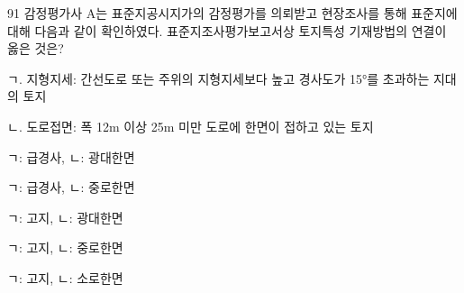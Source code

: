 \begin{question}{91}
감정평가사 A는 표준지공시지가의 감정평가를 의뢰받고 현장조사를 통해 표준지에 대해 다음과 같이 확인하였다. 표준지조사평가보고서상 토지특성 기재방법의 연결이 옳은 것은?
\begin{framedtext}
ㄱ. 지형지세: 간선도로 또는 주위의 지형지세보다 높고 경사도가 15°를 초과하는 지대의 토지 \par
ㄴ. 도로접면: 폭 12m 이상 25m 미만 도로에 한면이 접하고 있는 토지 \par
\end{framedtext}
\begin{choices}
  \item ㄱ: 급경사, ㄴ: 광대한면
  \item ㄱ: 급경사, ㄴ: 중로한면
  \item ㄱ: 고지, ㄴ: 광대한면
  \item ㄱ: 고지, ㄴ: 중로한면
  \item ㄱ: 고지, ㄴ: 소로한면
\end{choices}
\end{question}
